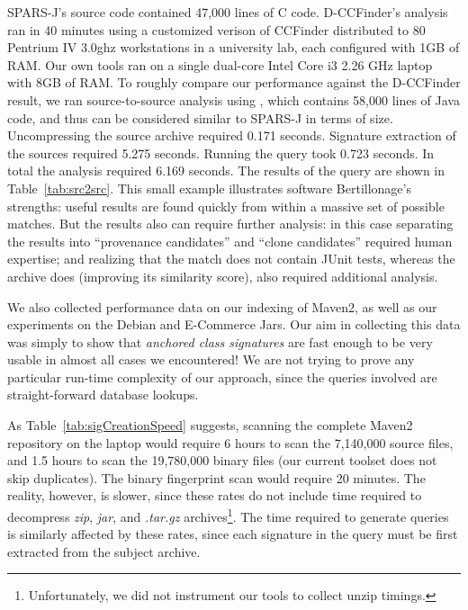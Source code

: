 SPARS-J's source code contained 47,000 lines of C code.  D-CCFinder's analysis
ran in 40 minutes using a customized verison of CCFinder distributed to 80 Pentrium IV 3.0ghz workstations
in a university lab, each configured with 1GB of RAM.
Our own tools ran on a single dual-core Intel Core i3 2.26 GHz
laptop with 8GB of RAM.
To roughly compare our performance against the D-CCFinder result, we ran source-to-source
analysis using , which contains 58,000 
lines of Java code, and thus can be considered similar to SPARS-J in terms
of size.   Uncompressing the source archive required 0.171 seconds.   Signature extraction of the sources
required 5.275 seconds.  Running the query took 0.723 seconds.  In total the analysis
required 6.169 seconds.  The results of
the query are shown in Table~\ref{tab:src2src}.
This small example illustrates software Bertillonage's strengths:  useful results
are found quickly from within a massive set of possible matches.  But the results also
can require further analysis:  in this case separating the results into ``provenance candidates''
and ``clone candidates'' required human expertise; and realizing that the 
match does not contain JUnit tests, whereas the  archive does (improving its similarity score),
also required additional analysis.

We also collected performance data on our indexing of Maven2, as well as our experiments
on the Debian and E-Commerce Jars.   Our aim in collecting this data was simply
to show that \emph{anchored class signatures} are fast enough to be very usable in almost all cases
we encountered!  We are not trying to prove
any particular run-time complexity of our approach, since the queries involved
are straight-forward database lookups.

As Table~\ref{tab:sigCreationSpeed} suggests, scanning the complete Maven2
repository on the laptop would require 6 hours to scan the 7,140,000 source
files, and 1.5 hours to scan the 19,780,000 binary files (our current
toolset does not skip duplicates).  The binary
fingerprint scan would require 20 minutes.  The reality, however, is
slower, since these rates do not include time required to decompress
\emph{zip}, \emph{jar}, and \emph{.tar.gz} archives\footnote{Unfortunately, we did not instrument our tools to collect unzip timings.}.
The time required to
generate queries is similarly affected by these rates, since each signature
in the query must be first extracted from the subject archive.

